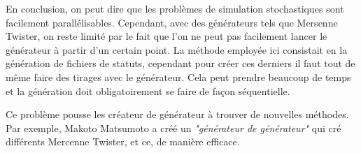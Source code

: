 \documentclass[a4paper]{article}
\begin{document}
En conclusion, on peut dire que les problèmes de simulation stochastiques sont
facilement parallélisables. Cependant, avec des générateurs tels que Mersenne
Twister, on reste limité par le fait que l'on ne peut pas facilement lancer le
générateur à partir d'un certain point. La méthode employée ici consistait en la
génération de fichiers de statuts, cependant pour créer ces derniers il faut
tout de même faire des tirages avec le générateur. Cela peut prendre beaucoup de
temps et la génération doit obligatoirement se faire de façon séquentielle.

Ce problème pousse les créateur de générateur à trouver de nouvelles méthodes.
Par exemple, Makoto Matsumoto a créé un \textit{"générateur de générateur"} qui
cré différents Mercenne Twister, et ce, de manière efficace.
\end{document}
